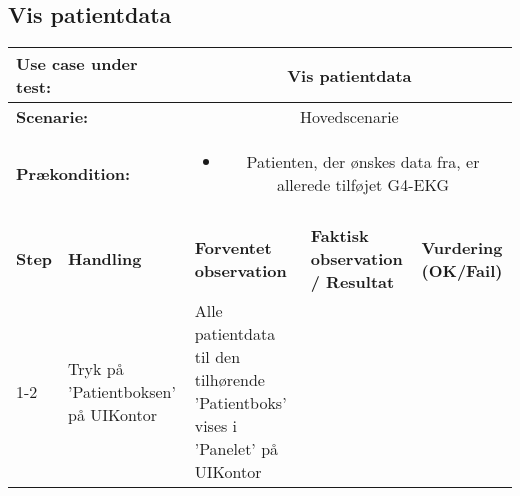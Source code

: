 \subsection{Vis patientdata}
\begin{tabular}{|p{1cm}|p{3cm}|p{4cm}|p{4cm}|p{2cm}|}
\hline
\multicolumn{2}{|p{4cm}|}{\textbf{Use case under test:}} & \multicolumn{3}{c|}{Vis patientdata} \\\hline

\multicolumn{2}{|p{3cm}|}{\textbf{Scenarie:}} & \multicolumn{3}{c|}{Hovedscenarie} \\\hline

\multicolumn{2}{|p{3cm}|}{\textbf{Prækondition:}}  & \multicolumn{3}{c|}{\parbox{0.8\textwidth}{
\begin{itemize}[label=$\circ$]
\item Patienten, der ønskes data fra, er allerede tilføjet G4-EKG 
\end{itemize} }}\\\hline

\multicolumn{5}{|c|}{} \\\hline

\textbf{Step} & \textbf{Handling} & \textbf{Forventet observation} & \textbf{Faktisk observation / Resultat} & \textbf{Vurdering (OK/Fail)}\\\hline

1-2 & Tryk på 'Patientboksen' på UIKontor & Alle patientdata til den tilhørende 'Patientboks' vises i 'Panelet' på UIKontor & & \\\hline

\end{tabular}
\\

